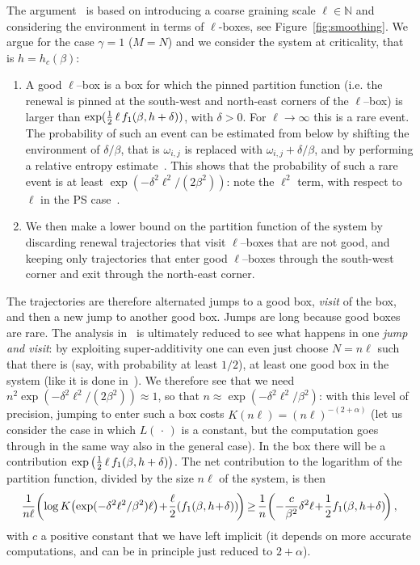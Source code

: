 \documentclass[11pt]{article}
\theoremstyle{definition}
\numberwithin{equation}{section}
\numberwithin{figure}{section}
\numberwithin{table}{section}
\newcommand{\ga}{\alpha}
\newcommand{\gb}{\beta}
\newcommand{\gd}{\delta}
\newcommand{\go}{\omega}
\newcommand{\tf}{\textsc{f}} %
\newcommand{\bbN}{\ensuremath{\mathbb{N}}}
\newcommand*{\Mk}{\mkern -2mu}
\begin{document}
The argument~\cite{cf:GT06} is based on introducing a coarse graining scale $\ell \in \bbN$ and considering the environment in terms of $\ell$-boxes, see Figure~\ref{fig:smoothing}. We argue for the case $\gamma=1$ ($M=N$) and we consider the system at criticality, that is $h=h_c(\gb)$:
\begin{enumerate}
\item A good $\ell$--box is a box for which the pinned partition function (i.e. the renewal is pinned at the south-west and north-east corners of the $\ell$--box) is larger than $\exp(\tfrac12\,\ell\,\tf_1(\gb, h+ \gd))$, with $\gd>0$. For $\ell\to \infty$ this is a rare event. The probability of such an event can be estimated from below by shifting the environment of $\gd/\gb$, that is $\go_{i,j}$ is replaced with $\go_{i,j}+ \gd/\gb$, and by performing a relative entropy estimate~\cite[Chapter~5]{cf:G}. This shows that the probability of such a rare event is at least $\exp(-\gd^2 \ell^2 /(2 \gb^2))$: note the $\ell^2$ term, with respect to $\ell$ in the PS case~\cite{cf:GT06}.
\item We then make a lower bound on the partition function of the system by discarding renewal trajectories that visit $\ell$--boxes that are not good, and keeping only trajectories that enter good $\ell$--boxes through the south-west corner and exit through the north-east corner.
\end{enumerate}


The trajectories are therefore alternated jumps to a good box, \emph{visit} of the box, and then a new jump to another good box. Jumps are long because good boxes are rare. The analysis in~\cite{cf:GT06} is ultimately reduced to see what happens in one \emph{jump and visit}: by exploiting super-additivity one can even just choose $N=n\ell$ such that there is (say, with probability at least $1/2$), at least one good box in the system (like it is done in~\cite{cf:BL11}). We therefore see that we need $n^2 \exp(-\gd^2 \ell^2 /(2 \gb^2))\approx 1$, so that $n \approx \exp(-\gd^2 \ell^2 / \gb^2)$: with this level of precision, jumping to enter such a box costs $K(n\ell) = (n\ell)^{-(2+\ga)}$ (let us consider the case in which $L({\,\cdot\,})$ is a constant, but the computation goes through in the same way also in the general case). In the box there will be a contribution $\exp\big(\tfrac12\,\ell\,\tf_1(\gb, h+ \gd) \big)$. The net contribution to the logarithm of the partition function, divided by the size $n\ell$ of the system, is then
\begin{equation}
\!\frac{1}{n \ell} \!\left(\log K\!\left(\exp(-\gd^2 \ell^2 / \gb^2) \ell \right)\!+\! \frac{\ell}{2} (\tf_1(\gb, h\!+\! \gd))\! \right) \Mk\ge\Mk \frac {1}{n} \!\left(-\frac{c}{\gb^2}\gd^2 \ell\!+\! \frac{1}{2} \tf_1(\gb, h\!+\! \gd)\! \right),\!
\end{equation}
with $c$ a positive constant that we have left implicit (it depends on more accurate computations, and can be in principle just reduced to $2+ \ga$).
\end{document}
